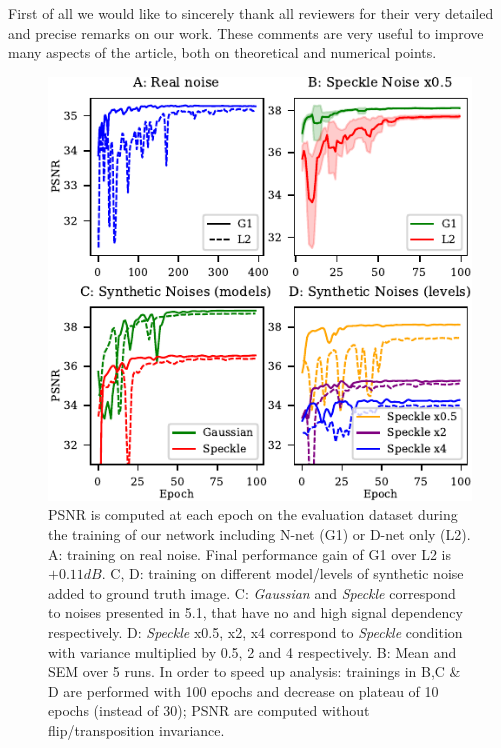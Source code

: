 \documentclass{article}
\begin{document}

First of all we would like to sincerely thank all reviewers for their very detailed and precise remarks on our work. These comments are very useful to improve many aspects of the article, both on theoretical and numerical points.
\begin{figure}[H]
\vskip -0.1in
\begin{center}
\includegraphics[width=\columnwidth]{fig_review.pdf}
\vskip -0.15in
\caption{PSNR is computed at each epoch on the evaluation dataset during the training of our network including N-net (G1) or D-net only (L2). A: training on real noise. Final performance gain of G1 over L2 is $+0.11dB$. C, D: training on different model/levels of synthetic noise added to ground truth image. C: \textit{Gaussian} and \textit{Speckle} correspond to noises presented in 5.1, that have no and high signal dependency respectively. D: \textit{Speckle} x0.5, x2, x4 correspond to \textit{Speckle} condition with variance multiplied by 0.5, 2 and 4 respectively. B: Mean and SEM over 5 runs. In order to speed up analysis: trainings in B,C \& D are performed with 100 epochs and decrease on plateau of 10 epochs (instead of 30); PSNR are computed without flip/transposition invariance.}
\label{fig:review}
\end{center}
\vskip -0.25in
\end{figure}
\end{document}
